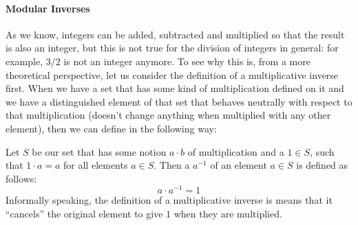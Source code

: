 \paragraph{Modular Inverses}
\label{sec:modular_inverses}
As we know, integers can be added, subtracted and multiplied so that the result is also an integer, but this is not true for the division of integers in general: for example, $3/2$ is not an integer anymore. To see why this is, from a more theoretical perspective, let us consider the definition of a multiplicative inverse first. When we have a set that has some kind of multiplication defined on it and we have a distinguished element of that set that behaves neutrally with respect to that multiplication (doesn't change anything when multiplied with any other element), then we can define  in the following way:

Let $S$ be our set that has some notion $a\cdot b$ of multiplication and a  $1\in S$, such that $1\cdot a = a$ for all elements $a\in S$. Then a  $a^{-1}$ of an element $a\in S$ is defined as follows:
\begin{equation}
a\cdot a^{-1} = 1
\end{equation}
Informally speaking, the definition of a multiplicative inverse is means that it ``cancels'' the original element to give $1$ when they are multiplied.

